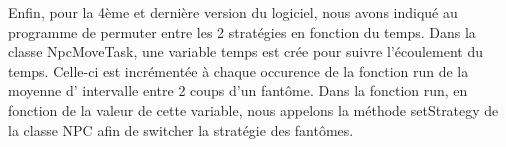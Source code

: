 \documentclass[a4paper,12pt]{report} %
\begin{document}
Enfin, pour la 4ème et dernière version du logiciel, nous avons indiqué au programme de permuter entre les 2 stratégies en fonction du temps.
Dans la classe NpcMoveTask, une variable temps est crée pour suivre l'écoulement du temps. Celle-ci est incrémentée à chaque occurence de la fonction run de la moyenne d' intervalle entre 2 coups d'un fantôme. 
Dans la fonction run, en fonction de la valeur de cette variable, nous appelons la méthode setStrategy de la classe NPC afin de switcher la stratégie des fantômes.
\end{document}
